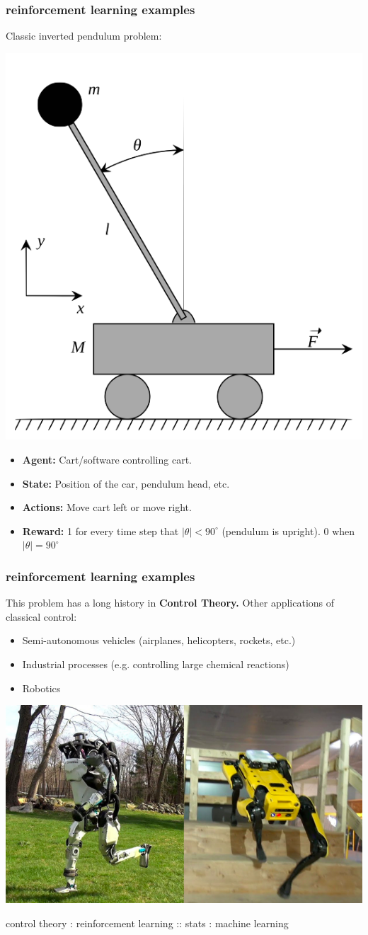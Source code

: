 \documentclass[handout,compress]{beamer}
\begin{document}
\begin{frame}
	\frametitle{reinforcement learning examples}
	\small
	Classic inverted pendulum problem:
	\begin{center}
		\includegraphics*[width=.3\textwidth]{cart.png}
	\end{center}
\begin{multicols}{2}
	\begin{itemize}
		\item \textbf{Agent:} Cart/software controlling cart.
		\item \textbf{State:} Position of the car, pendulum head, etc. 
		\vspace{3em}
		
		\item \textbf{Actions:} Move cart left or move right.
		\item \textbf{Reward:} 1 for every time step that $|\theta| < 90^\circ$ (pendulum is upright). $0$ when $|\theta| = 90^\circ$
	\end{itemize}
\end{multicols}
\end{frame}

\begin{frame}
	\frametitle{reinforcement learning examples}
			\small
	This problem has a long history in \textbf{Control Theory.} Other applications of classical control:
	\begin{itemize}
		\item Semi-autonomous vehicles (airplanes, helicopters, rockets, etc.)
		\item Industrial processes (e.g. controlling large chemical reactions)
		\item Robotics
	\end{itemize}
	\begin{center}		
		\includegraphics[width=.5\textwidth]{boston.png}
		
		control theory : reinforcement learning :: stats : machine learning
	\end{center}
\end{frame}
\end{document}
